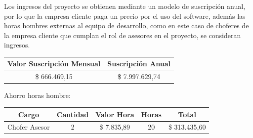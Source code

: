 \documentclass[12pt]{article}
\begin{document}
Los ingresos del proyecto se obtienen mediante un modelo de suscripción anual, por lo que la empresa cliente paga un precio por el uso del software, además las horas hombres externas al equipo de desarrollo, como en este caso de choferes de la empresa cliente que cumplan el rol de asesores en el proyecto, se consideran ingresos.
\begin{table}[!h]
    \centering
    \begin{tabular}{|c|c|}
        \hline
         \textbf{Valor Suscripción Mensual} & \textbf{Suscripción Anual} \\
         \hline
         \$ 666.469,15 & \$ 7.997.629,74 \\
         \hline
    \end{tabular}
\end{table}
Ahorro horas hombre:
\begin{table}[!h]
    \centering
    \begin{tabular}{|c|c|c|c|c|}
        \hline
         \textbf{Cargo} & \textbf{Cantidad} & \textbf{Valor Hora} & \textbf{Horas} & \textbf{Total}\\
         \hline
         Chofer Asesor & 2 & \$ 7.835,89 & 20 & \$ 313.435,60 \\ 
         \hline
    \end{tabular}
\end{table}

\newpage
\end{document}
